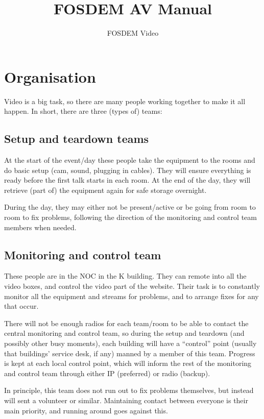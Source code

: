 \documentclass{article}
\title{FOSDEM AV Manual}
\author{FOSDEM Video}
\begin{document}
\maketitle \thispagestyle{empty}
\newpage

\tableofcontents
\newpage

\section{Organisation}
Video is a big task, so there are many people working together to make it all happen. In short, there are three (types of) teams:

\subsection{Setup and teardown teams}
At the start of the event/day these people take the equipment to the rooms and do basic setup (cam, sound, plugging in cables). They will ensure everything is ready before the first talk starts in each room.
At the end of the day, they will retrieve (part of) the equipment again for safe storage overnight.

During the day, they may either not be present/active or be going from room to room to fix problems, following the direction of the monitoring and control team members when needed.

\subsection{Monitoring and control team}
These people are in the NOC in the K building. They can remote into all the video boxes, and control the video part of the website.
Their task is to constantly monitor all the equipment and streams for problems, and to arrange fixes for any that occur.

There will not be enough radios for each team/room to be able to contact the central monitoring and control team, so during the setup and teardown (and possibly other busy moments), each building will have a ``control'' point (usually that buildings' service desk, if any) manned by a member of this team. Progress is kept at each local control point, which will inform the rest of the monitoring and control team through either IP (preferred) or radio (backup).

In principle, this team does not run out to fix problems themselves, but instead will sent a volunteer or similar. Maintaining contact between everyone is their main priority, and running around goes against this.
\end{document}

